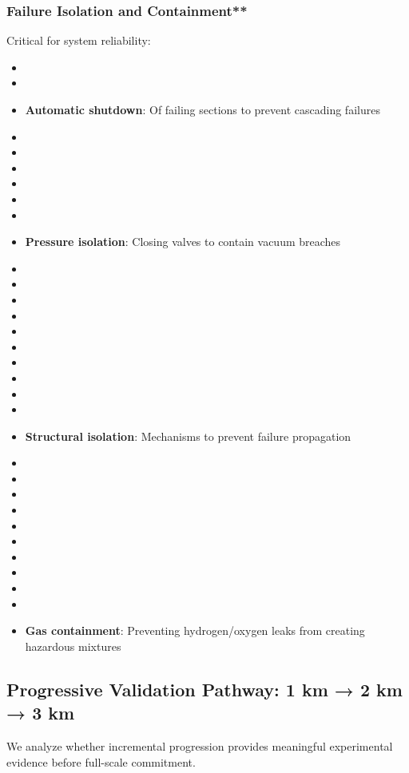 \subsubsection{Failure Isolation and Containment**}
Critical for system reliability:
\begin{itemize}
    \item \item \item \textbf{Automatic shutdown}: Of failing sections to prevent cascading failures \cite{nancy2003}
    \item \item \item \item \item \item \item \textbf{Pressure isolation}: Closing valves to contain vacuum breaches \cite{holland2004}
    \item \item \item \item \item \item \item \item \item \item \item \textbf{Structural isolation}: Mechanisms to prevent failure propagation \cite{sales2011}
    \item \item \item \item \item \item \item \item \item \item \item \textbf{Gas containment}: Preventing hydrogen/oxygen leaks from creating hazardous mixtures \cite{zalkind2015}
\end{itemize}

\subsection{Progressive Validation Pathway: 1 km → 2 km → 3 km}
We analyze whether incremental progression provides meaningful experimental evidence before full-scale commitment.

